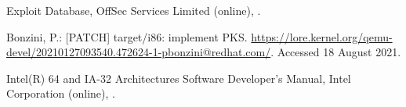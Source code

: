 \documentclass[english,sigrecommended,JIP]{ipsj}
\begin{document}
\begin{thebibliography}{99}



Exploit Database, OffSec Services Limited (online),
 .

  
    Bonzini, P.: [PATCH] target/i86: implement PKS. \url{https://lore.kernel.org/qemu-devel/20210127093540.472624-1-pbonzini@redhat.com/}. Accessed 18 August 2021.

  Intel(R) 64 and IA-32 Architectures Software Developer’s Manual, Intel Corporation (online),  .



\end{thebibliography}
\end{document}
